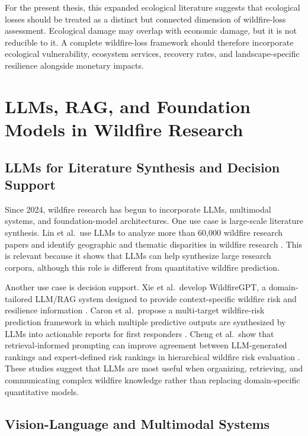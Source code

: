 For the present thesis, this expanded ecological literature suggests that ecological losses should be treated as a distinct but connected dimension of wildfire-loss assessment. Ecological damage may overlap with economic damage, but it is not reducible to it. A complete wildfire-loss framework should therefore incorporate ecological vulnerability, ecosystem services, recovery rates, and landscape-specific resilience alongside monetary impacts.

\section{LLMs, RAG, and Foundation Models in Wildfire Research}

\subsection{LLMs for Literature Synthesis and Decision Support}

Since 2024, wildfire research has begun to incorporate LLMs, multimodal systems, and foundation-model architectures. One use case is large-scale literature synthesis. Lin et al.\ use LLMs to analyze more than 60,000 wildfire research papers and identify geographic and thematic disparities in wildfire research \citep{lin2024llmresearch}. This is relevant because it shows that LLMs can help synthesize large research corpora, although this role is different from quantitative wildfire prediction.

Another use case is decision support. Xie et al.\ develop WildfireGPT, a domain-tailored LLM/RAG system designed to provide context-specific wildfire risk and resilience information \citep{xie2024wildfiregpt,xie2025rag}. Caron et al.\ propose a multi-target wildfire-risk prediction framework in which multiple predictive outputs are synthesized by LLMs into actionable reports for first responders \citep{caron2026multitarget}. Cheng et al.\ show that retrieval-informed prompting can improve agreement between LLM-generated rankings and expert-defined risk rankings in hierarchical wildfire risk evaluation \citep{cheng2026retrieval}. These studies suggest that LLMs are most useful when organizing, retrieving, and communicating complex wildfire knowledge rather than replacing domain-specific quantitative models.

\subsection{Vision-Language and Multimodal Systems}

